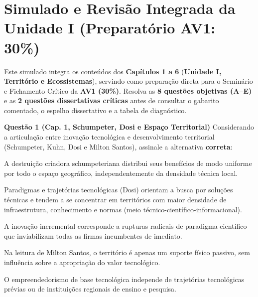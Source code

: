 \clearpage
{}
{}
\chapter*{Simulado e Revisão Integrada da Unidade I (Preparatório AV1: 30\%)}

\begin{capObjetivos}
Este simulado integra os conteúdos dos \textbf{Capítulos 1 a 6} (\textbf{Unidade I, Território e Ecossistemas}), servindo como preparação direta para o Seminário e Fichamento Crítico da \textbf{AV1 (30\%)}. Resolva as \textbf{8 questões objetivas (A--E)} e as \textbf{2 questões dissertativas críticas} antes de consultar o gabarito comentado, o espelho dissertativo e a tabela de diagnóstico.
\end{capObjetivos}


\textbf{Questão 1 (Cap. 1, Schumpeter, Dosi e Espaço Territorial)}
Considerando a articulação entre inovação tecnológica e desenvolvimento territorial (Schumpeter, Kuhn, Dosi e Milton Santos), assinale a alternativa \textbf{correta}:
\begin{alternativas}
  \item A destruição criadora schumpeteriana distribui seus benefícios de modo uniforme por todo o espaço geográfico, independentemente da densidade técnica local.
  \item Paradigmas e trajetórias tecnológicas (Dosi) orientam a busca por soluções técnicas e tendem a se concentrar em territórios com maior densidade de infraestrutura, conhecimento e normas (meio técnico-científico-informacional).
  \item A inovação incremental corresponde a rupturas radicais de paradigma científico que inviabilizam todas as firmas incumbentes de imediato.
  \item Na leitura de Milton Santos, o território é apenas um suporte físico passivo, sem influência sobre a apropriação do valor tecnológico.
  \item O empreendedorismo de base tecnológica independe de trajetórias tecnológicas prévias ou de instituições regionais de ensino e pesquisa.
\end{alternativas}

